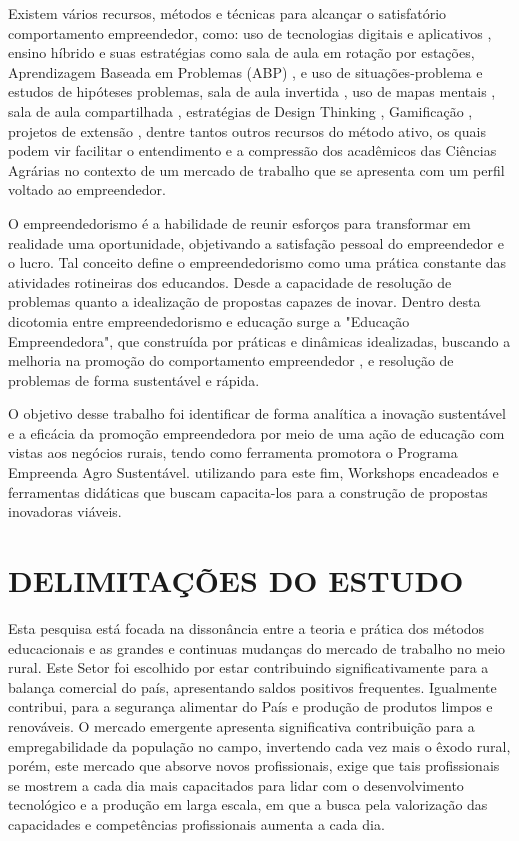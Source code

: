 Existem vários recursos, métodos e técnicas para alcançar o satisfatório comportamento empreendedor, como: uso de tecnologias digitais e aplicativos \cite{pereira_use_2020}, ensino híbrido e suas estratégias como sala de aula em rotação por estações, Aprendizagem Baseada em Problemas (ABP) \cite{souza_aprendizagem_2015}, e uso de situações-problema e estudos de hipóteses problemas, sala de aula invertida \cite{junior_sala_2016,branco_sala_2016}, uso de mapas mentais \cite{junior_percepcao_2018}, sala de aula compartilhada \cite{strack_por_2009}, estratégias de Design Thinking \cite{andrews_circular_2015}, Gamificação \cite{ogawa_avaliacao_2016}, projetos de extensão \cite{garcia_contribuicao_2012}, dentre tantos outros recursos do método ativo, os quais podem vir facilitar o entendimento e a compressão dos acadêmicos das Ciências Agrárias no contexto de um mercado de trabalho que se apresenta com um perfil voltado ao empreendedor.

O empreendedorismo é a habilidade de reunir esforços para transformar em realidade uma oportunidade, objetivando a satisfação pessoal do empreendedor e o lucro. Tal conceito define o empreendedorismo como uma prática constante das atividades rotineiras dos educandos. Desde a capacidade de resolução de problemas quanto a idealização de propostas capazes de inovar. Dentro desta dicotomia entre empreendedorismo e educação surge a "Educação Empreendedora", que construída por práticas e dinâmicas idealizadas, buscando a melhoria na promoção do comportamento empreendedor \cite{martins_educacao_2016, morais_empreendedorismo_2018}, e resolução de problemas de forma sustentável e rápida.

O objetivo desse trabalho foi identificar de forma analítica a inovação sustentável e a eficácia da promoção empreendedora por meio de uma ação de educação com vistas aos negócios rurais, tendo como ferramenta promotora o Programa Empreenda Agro Sustentável. utilizando para este fim, Workshops encadeados e ferramentas didáticas que buscam capacita-los para a construção de propostas inovadoras viáveis.


\section{DELIMITAÇÕES DO ESTUDO}

Esta pesquisa está focada na dissonância entre a teoria e prática dos métodos educacionais e as grandes e continuas mudanças do mercado de trabalho no meio rural. Este Setor foi escolhido por estar contribuindo significativamente para a balança comercial do país, apresentando saldos positivos frequentes. Igualmente contribui, para a segurança alimentar do País e produção de produtos limpos e renováveis. O mercado emergente apresenta significativa contribuição para a empregabilidade da população no campo, invertendo cada vez mais o êxodo rural, porém, este mercado que absorve novos profissionais, exige que tais profissionais se mostrem a cada dia mais capacitados para lidar com o desenvolvimento tecnológico e a produção em larga escala, em que a busca pela valorização das capacidades e competências profissionais aumenta a cada dia. 

